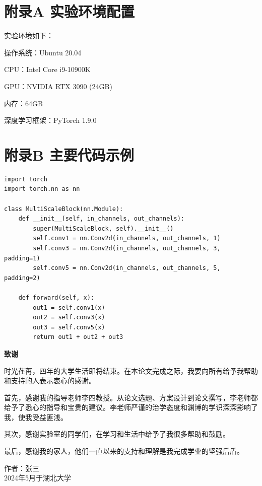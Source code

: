 \documentclass[a4paper,12pt]{article}
\begin{document}
\newpage
\appendix
\section{附录A 实验环境配置}

实验环境如下：

操作系统：Ubuntu 20.04

CPU：Intel Core i9-10900K

GPU：NVIDIA RTX 3090 (24GB)

内存：64GB

深度学习框架：PyTorch 1.9.0

\section{附录B 主要代码示例}

\begin{verbatim}
import torch
import torch.nn as nn

class MultiScaleBlock(nn.Module):
    def __init__(self, in_channels, out_channels):
        super(MultiScaleBlock, self).__init__()
        self.conv1 = nn.Conv2d(in_channels, out_channels, 1)
        self.conv3 = nn.Conv2d(in_channels, out_channels, 3, padding=1)
        self.conv5 = nn.Conv2d(in_channels, out_channels, 5, padding=2)
        
    def forward(self, x):
        out1 = self.conv1(x)
        out2 = self.conv3(x)
        out3 = self.conv5(x)
        return out1 + out2 + out3
\end{verbatim}

\newpage
{}
{}
\begin{center}
    {\bfseries 致\hspace{4\ccwd}谢}
\end{center}

\vspace{0.5cm}

时光荏苒，四年的大学生活即将结束。在本论文完成之际，我要向所有给予我帮助和支持的人表示衷心的感谢。

首先，感谢我的指导老师李四教授。从论文选题、方案设计到论文撰写，李老师都给予了悉心的指导和宝贵的建议。李老师严谨的治学态度和渊博的学识深深影响了我，使我受益匪浅。

其次，感谢实验室的同学们，在学习和生活中给予了我很多帮助和鼓励。

最后，感谢我的家人，他们一直以来的支持和理解是我完成学业的坚强后盾。

\vspace{1cm}
\begin{flushright}
    作者：张三 \\
    2024年5月于湖北大学
\end{flushright}
\end{document}
